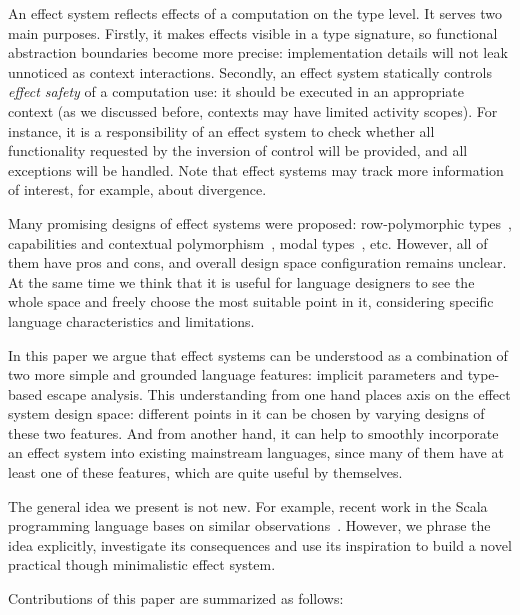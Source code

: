 \documentclass[acmsmall]{acmart}
\begin{document}
An effect system reflects effects of a computation on the type level.
It serves two main purposes.
Firstly, it makes effects visible in a type signature, so functional abstraction boundaries become more precise: implementation details will not leak unnoticed as context interactions.
Secondly, an effect system statically controls \textit{effect safety} of a computation use: it should be executed in an appropriate context (as we discussed before, contexts may have limited activity scopes).
For instance, it is a responsibility of an effect system to check whether all functionality requested by the inversion of control will be provided, and all exceptions will be handled.
Note that effect systems may track more information of interest, for example, about divergence.

Many promising designs of effect systems were proposed: row-polymorphic types~\cite{leijen2014koka}, capabilities and contextual polymorphism~\cite{brachthauser2022effects, boruch2023capturing}, modal types~\cite{tang2025modal}, etc.
However, all of them have pros and cons, and overall design space configuration remains unclear.
At the same time we think that it is useful for language designers to see the whole space and freely choose the most suitable point in it, considering specific language characteristics and limitations.

In this paper we argue that effect systems can be understood as a combination of two more simple and grounded language features: implicit parameters and type-based escape analysis.
This understanding from one hand places axis on the effect system design space: different points in it can be chosen by varying designs of these two features.
And from another hand, it can help to smoothly incorporate an effect system into existing mainstream languages, since many of them have at least one of these features, which are quite useful by themselves.

The general idea we present is not new.
For example, recent work in the Scala programming language bases on similar observations~\cite{odersky2021safer, boruch2023capturing}.
However, we phrase the idea explicitly, investigate its consequences and use its inspiration to build a novel practical though minimalistic effect system.


Contributions of this paper are summarized as follows:
\end{document}

